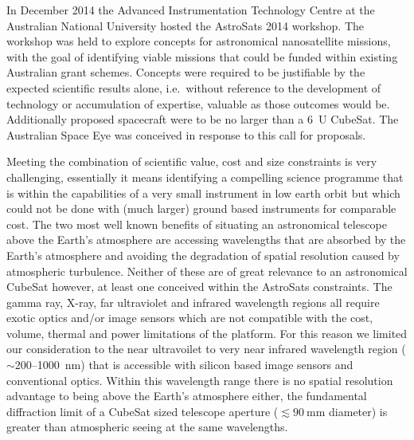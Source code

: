 \documentclass[]{iac}
\begin{document}
In December 2014 the Advanced Instrumentation Technology Centre at the
Australian National University hosted the AstroSats 2014 workshop. The workshop was held to explore concepts for
astronomical nanosatellite missions, with the goal of identifying viable missions that could be funded within existing
Australian grant schemes. Concepts were required to be justifiable by the expected scientific results alone, i.e.\
without reference to the development of technology or accumulation of expertise, valuable as those outcomes would be.
Additionally proposed spacecraft were to be no larger than a \SI{6}{U} CubeSat. The Australian Space Eye was conceived
in response to this call for proposals.

Meeting the combination of scientific value, cost and size constraints is very challenging, essentially it means
identifying a compelling science programme that is within the capabilities of a very small instrument in low earth orbit
but which could not be done with (much larger) ground based instruments for comparable cost.  The two most well known
benefits of situating an astronomical telescope above the Earth's atmosphere are accessing wavelengths that are absorbed
by the Earth's atmosphere and avoiding the degradation of spatial resolution caused by atmospheric turbulence. Neither
of these are of great relevance to an astronomical CubeSat however, at least one conceived within the AstroSats
constraints. The gamma ray, X-ray, far ultraviolet and infrared wavelength regions all require exotic optics and/or
image sensors which are not compatible with the cost, volume, thermal and power limitations of the platform. For this
reason we limited our consideration to the near ultravoilet to very near infrared wavelength region
($\sim200$--\SI{1000}{\nano\metre}) that is accessible with silicon based image sensors and conventional optics. Within
this wavelength range there is no spatial resolution advantage to being above the Earth's atmosphere either, the
fundamental diffraction limit of a CubeSat sized telescope aperture ($\lesssim\SI{90}{\milli\metre}$ diameter) is
greater than atmospheric seeing at the same wavelengths.
\end{document}
